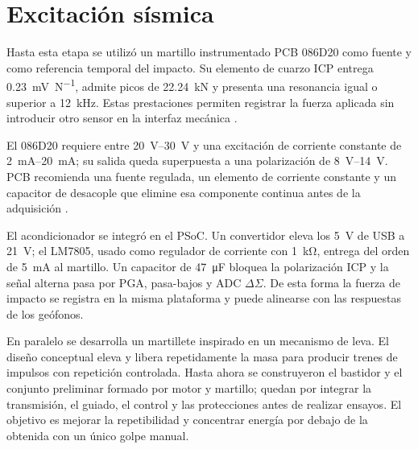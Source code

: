 \section{Excitación sísmica}
\label{sec:excitacion}

Hasta esta etapa se utilizó un martillo instrumentado PCB 086D20 como fuente y como
referencia temporal del impacto. Su elemento de cuarzo ICP entrega
\SI{0.23}{\milli\volt\per\newton}, admite picos de \SI{22.24}{\kilo\newton} y presenta
una resonancia igual o superior a \SI{12}{\kilo\hertz}. Estas prestaciones permiten
registrar la fuerza aplicada sin introducir otro sensor en la interfaz mecánica
\cite{PCB086D20}.

El 086D20 requiere entre \SIrange{20}{30}{\volt} y una excitación de corriente constante
de \SIrange{2}{20}{\milli\ampere}; su salida queda superpuesta a una polarización de
\SIrange{8}{14}{\volt}. PCB recomienda una fuente regulada, un elemento de corriente
constante y un capacitor de desacople que elimine esa componente continua antes de la
adquisición \cite{PCBSignalConditioning}.

El acondicionador se integró en el PSoC. Un convertidor eleva los \SI{5}{\volt} de USB a
\SI{21}{\volt}; el LM7805, usado como regulador de corriente con \SI{1}{\kilo\ohm},
entrega del orden de \SI{5}{\milli\ampere} al martillo. Un capacitor de
\SI{47}{\micro\farad} bloquea la polarización ICP y la señal alterna pasa por PGA,
pasa-bajos y ADC $\Delta\Sigma$. De esta forma la fuerza de impacto se registra en la
misma plataforma y puede alinearse con las respuestas de los geófonos.

En paralelo se desarrolla un martillete inspirado en un mecanismo de leva. El diseño
conceptual eleva y libera repetidamente la masa para producir trenes de impulsos con
repetición controlada. Hasta ahora se construyeron el bastidor y el conjunto preliminar
formado por motor y martillo; quedan por integrar la transmisión, el guiado, el control
y las protecciones antes de realizar ensayos. El objetivo es mejorar la repetibilidad y
concentrar energía por debajo de la obtenida con un único golpe manual.

